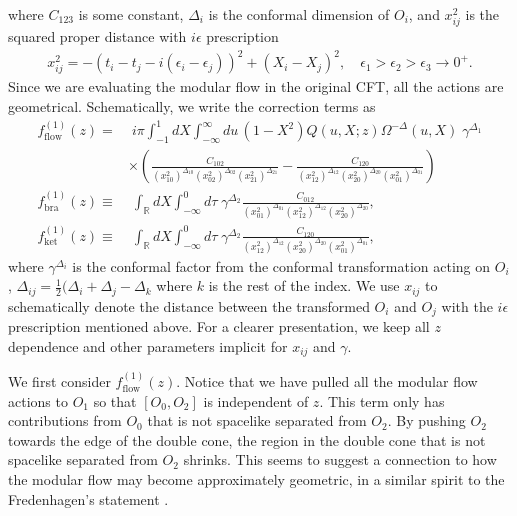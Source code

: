 \documentclass[a4paper,11pt]{article}
\theoremstyle{definition}
\begin{document}
where $C_{123}$ is some constant, $\Delta_i$ is the conformal dimension of $O_i$, and $x_{ij}^2$ is the squared proper distance with $i\epsilon$ prescription
\begin{gather}
    x_{ij}^2 = -(t_i-t_j-i(\epsilon_i-\epsilon_j))^2 + (X_i-X_j)^2, \quad \epsilon_1 > \epsilon_2 > \epsilon_3 \to 0^+.
\end{gather}
Since we are evaluating the modular flow in the original CFT, all the actions are geometrical. Schematically, we write the correction terms as
\begin{align}
    f^{(1)}_{\text{flow}}(z) =&\; i\pi  \int_{-1}^1 dX \int_{-\infty}^{\infty} du \, (1-X^2)Q(u,X;z) \Omega^{-\Delta}(u,X) \;\gamma^{\Delta_1} \nonumber\\
    &\times\left(\frac{C_{102}}{(x_{10}^2)^{\Delta_{10}}(x_{02}^2)^{\Delta_{02}}(x_{21}^2)^{\Delta_{21}}} -\frac{C_{120}}{(x_{12}^2)^{\Delta_{12}}(x_{20}^2)^{\Delta_{20}}(x_{01}^2)^{\Delta_{01}}}\right) \\
    f^{(1)}_{\text{bra}}(z) \equiv&\; \int_\mathbb{R} dX \int_{-\infty}^{0} d\tau \;\gamma^{\Delta_2} \frac{C_{012}}{(x_{01}^2)^{\Delta_{01}}(x_{12}^2)^{\Delta_{12}}(x_{20}^2)^{\Delta_{20}}},\\
    f^{(1)}_{\text{ket}}(z) \equiv&\; \int_\mathbb{R} dX \int_{-\infty}^{0} d\tau \; \gamma^{\Delta_2}\frac{C_{120}}{(x_{12}^2)^{\Delta_{12}}(x_{20}^2)^{\Delta_{20}}(x_{01}^2)^{\Delta_{01}}},
\end{align}
where $\gamma^{\Delta_i}$ is the conformal factor from the conformal transformation acting on $O_i$, $\Delta_{ij} = \frac{1}{2}(\Delta_i+\Delta_j - \Delta_k$ where $k$ is the rest of the index. We use $x_{ij}$ to schematically denote the distance between the transformed $O_i$ and $O_j$ with the $i\epsilon$ prescription mentioned above. For a clearer presentation, we keep all $z$ dependence and other parameters implicit for $x_{ij}$ and $\gamma$. 

We first consider $f^{(1)}_{\text{flow}}(z)$. Notice that we have pulled all the modular flow actions to $O_1$ so that $[O_0,O_2]$ is independent of $z$. This term only has contributions from $O_0$ that is not spacelike separated from $O_2$. By pushing $O_2$ towards the edge of the double cone, the region in the double cone that is not spacelike separated from $O_2$ shrinks. This seems to suggest a connection to how the modular flow may become approximately geometric, in a similar spirit to the Fredenhagen's statement \cite{fredenhagen}. 
\end{document}

